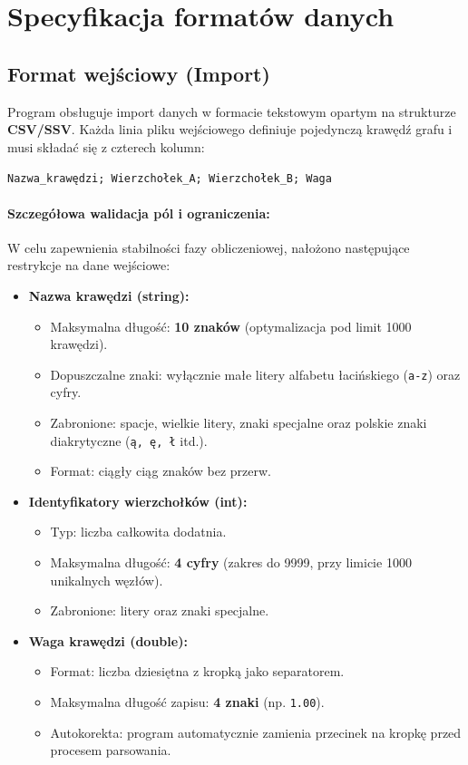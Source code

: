 \documentclass[12pt,a4paper]{article}
\begin{document}
\section{Specyfikacja formatów danych}

\subsection{Format wejściowy (Import)}

Program obsługuje import danych w formacie tekstowym opartym na strukturze \textbf{CSV/SSV}. Każda linia pliku wejściowego definiuje pojedynczą krawędź grafu i musi składać się z czterech kolumn:
\begin{center}
    \texttt{Nazwa\_krawędzi; Wierzchołek\_A; Wierzchołek\_B; Waga}
\end{center}

\paragraph{Szczegółowa walidacja pól i ograniczenia:}
W celu zapewnienia stabilności fazy obliczeniowej, nałożono następujące restrykcje na dane wejściowe:

\begin{itemize}[label=\textbullet]
    \item \textbf{Nazwa krawędzi (string):} 
        \begin{itemize}[label=---]
            \item Maksymalna długość: \textbf{10 znaków} (optymalizacja pod limit 1000 krawędzi).
            \item Dopuszczalne znaki: wyłącznie małe litery alfabetu łacińskiego (\texttt{a-z}) oraz cyfry.
            \item Zabronione: spacje, wielkie litery, znaki specjalne oraz polskie znaki diakrytyczne (\texttt{ą, ę, ł} itd.).
            \item Format: ciągły ciąg znaków bez przerw.
        \end{itemize}
    \item \textbf{Identyfikatory wierzchołków (int):} 
        \begin{itemize}[label=---]
            \item Typ: liczba całkowita dodatnia.
            \item Maksymalna długość: \textbf{4 cyfry} (zakres do 9999, przy limicie 1000 unikalnych węzłów).
            \item Zabronione: litery oraz znaki specjalne.
        \end{itemize}
    \item \textbf{Waga krawędzi (double):} 
        \begin{itemize}[label=---]
            \item Format: liczba dziesiętna z kropką jako separatorem.
            \item Maksymalna długość zapisu: \textbf{4 znaki} (np. \texttt{1.00}).
            \item Autokorekta: program automatycznie zamienia przecinek na kropkę przed procesem parsowania.
        \end{itemize}
\end{itemize}
\end{document}
